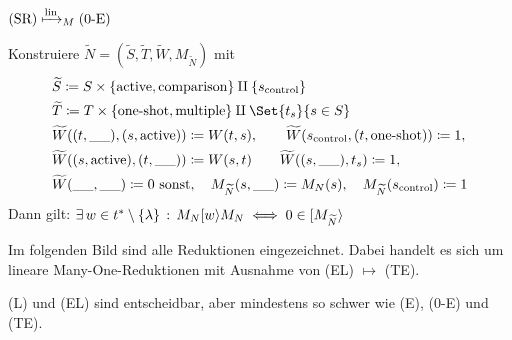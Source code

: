 \documentclass{cheat-sheet}
\newcommand{\activeTransition}[1]{[{#1}\rangle} %
\newcommand{\reducesTo}{\mapsto} %
\newcommand{\reducesManyOneToLin}{\xmapsto{\mathrm{lin}}_M} %
\begin{document}
\begin{satz}
  $\text{(SR)} \reducesManyOneToLin \text{(0-E)}$
\end{satz}

\begin{beweis}
  Konstruiere $\widetilde{N} = (\widetilde{S}, \widetilde{T}, \widetilde{W}, M_{\widetilde{N}})$ mit
  \begin{align*}
    & \widetilde{S} \coloneqq S \times \{ \text{active}, \text{comparison} \} \amalg \{ s_{\mathrm{control}} \} \\
    & \widetilde{T} \coloneqq T \times \{ \text{one-shot}, \mathrm{multiple} \} \amalg \Set{t_s}{s \in S} \\
    & \widetilde{W}((t, \_\_), (s, \mathrm{active})) \coloneqq W(t, s), \qquad
    \widetilde{W}(s_\text{control}, (t, \text{one-shot})) \coloneqq 1, \\
    & \widetilde{W}((s, \text{active}), (t, \_\_)) \coloneqq W(s, t) \qquad
    \widetilde{W}((s, \_\_), t_s) \coloneqq 1, \\
    & \widetilde{W}(\_\_, \_\_) \coloneqq 0 \text{ sonst}, \quad
    M_{\widetilde{N}}(s, \_\_) \coloneqq M_N(s), \quad
    M_{\widetilde{N}}(s_\mathrm{control}) \coloneqq 1
  \end{align*}
  Dann gilt: \quad
  $\ex{w \in t^* \setminus \{\lambda\}} M_N \activeTransition{w} M_N \iff 0 \in \activeTransition{M_{\widetilde{N}}}$
\end{beweis}

\begin{fazit}
  Im folgenden Bild sind alle Reduktionen eingezeichnet.
  Dabei handelt es sich um lineare Many-One-Reduktionen mit Ausnahme von (EL) $\reducesTo$ (TE).

  \begin{center}\end{center}

  (L) und (EL) sind entscheidbar, aber mindestens so schwer wie (E), (0-E) und (TE).
\end{fazit}
\end{document}
